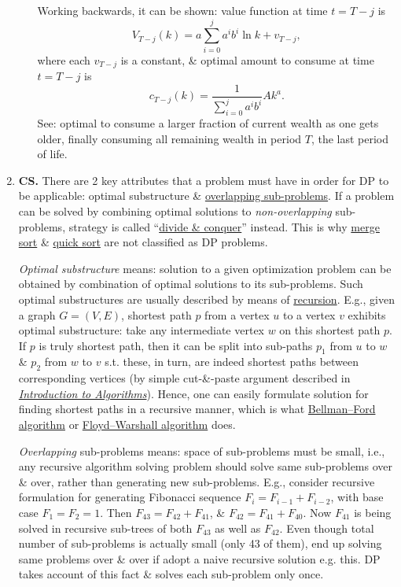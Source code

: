 \documentclass{article}
\begin{document}
\begin{enumerate}
\begin{itemize}
		Working backwards, it can be shown: value function at time $t = T - j$ is
		\begin{equation*}
			V_{T-j}(k) = a\sum_{i=0}^j a^ib^i\ln k + v_{T-j},
		\end{equation*}
		where each $v_{T-j}$ is a constant, \& optimal amount to consume at time $t = T - j$ is
		\begin{equation*}
			c_{T-j}(k) = \frac{1}{\sum_{i=0}^j a^ib^i}Ak^a.
		\end{equation*}
		See: optimal to consume a larger fraction of current wealth as one gets older, finally consuming all remaining wealth in period $T$, the last period of life.
	\end{itemize}
	\item {\bf CS.} There are 2 key attributes that a problem must have in order for DP to be applicable: optimal substructure \& \href{https://en.wikipedia.org/wiki/Overlapping_subproblem}{overlapping sub-problems}. If a problem can be solved by combining optimal solutions to {\it non-overlapping} sub-problems, strategy is called ``\href{https://en.wikipedia.org/wiki/Divide_and_conquer_algorithm}{divide \& conquer}'' instead. This is why \href{https://en.wikipedia.org/wiki/Mergesort}{merge sort} \& \href{https://en.wikipedia.org/wiki/Quicksort}{quick sort} are not classified as DP problems.

	{\it Optimal substructure} means: solution to a given optimization problem can be obtained by combination of optimal solutions to its sub-problems. Such optimal substructures are usually described by means of \href{https://en.wikipedia.org/wiki/Recursion}{recursion}. E.g., given a graph $G = (V,E)$, shortest path $p$ from a vertex $u$ to a vertex $v$ exhibits optimal substructure: take any intermediate vertex $w$ on this shortest path $p$. If $p$ is truly shortest path, then it can be split into sub-paths $p_1$ from $u$ to $w$ \& $p_2$ from $w$ to $v$ s.t. these, in turn, are indeed shortest paths between corresponding vertices (by simple cut-\&-paste argument described in \href{https://en.wikipedia.org/wiki/Introduction_to_Algorithms}{\it Introduction to Algorithms}). Hence, one can easily formulate solution for finding shortest paths in a recursive manner, which is what \href{https://en.wikipedia.org/wiki/Bellman%E2%80%93Ford_algorithm}{Bellman--Ford algorithm} or \href{https://en.wikipedia.org/wiki/Floyd%E2%80%93Warshall_algorithm}{Floyd--Warshall algorithm} does.

	{\it Overlapping} sub-problems means: space of sub-problems must be small, i.e., any recursive algorithm solving problem should solve same sub-problems over \& over, rather than generating new sub-problems. E.g., consider recursive formulation for generating Fibonacci sequence $F_i = F_{i-1} + F_{i-2}$, with base case $F_1 = F_2 = 1$. Then $F_{43} = F_{42} + F_{41}$, \& $F_{42} = F_{41} + F_{40}$. Now $F_{41}$ is being solved in recursive sub-trees of both $F_{43}$ as well as $F_{42}$. Even though total number of sub-problems is actually small (only 43 of them), end up solving same problems over \& over if adopt a naive recursive solution e.g. this. DP takes account of this fact \& solves each sub-problem only once.


\end{enumerate}
\end{document}
